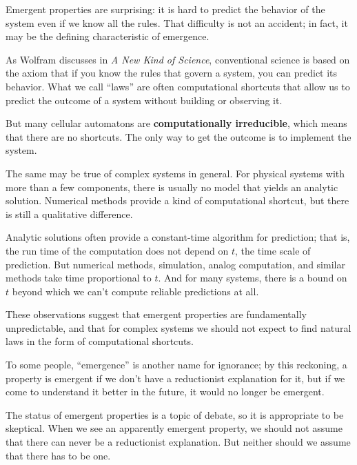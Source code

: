 \documentclass[12pt]{book}
\theoremstyle{exercise}
\begin{document}
Emergent properties are surprising: it is hard to predict the behavior
of the system even if we know all the rules.  That difficulty is not
an accident; in fact, it may be the defining characteristic of emergence.

As Wolfram discusses in {\em A New Kind of Science}, conventional science
is based on the axiom that if you know the rules that govern a system,
you can predict its behavior.  What we call ``laws'' are often
computational shortcuts that allow us to predict the outcome of a
system without building or observing it.


But many cellular automatons are {\bf computationally irreducible},
which means that there are no shortcuts.  The only way to get the
outcome is to implement the system.


The same may be true of complex systems in general.  For physical
systems with more than a few components, there is usually no model
that yields an analytic solution.  Numerical methods provide a kind of
computational shortcut, but there is still a qualitative difference.


Analytic solutions often provide a constant-time algorithm for
prediction; that is, the run time of the computation does not depend
on $t$, the time scale of prediction.  But numerical methods,
simulation, analog computation, and similar methods take time
proportional to $t$.  And for many systems, there is a bound on $t$
beyond which we can't compute reliable predictions at all.

These observations suggest that emergent properties are fundamentally
unpredictable, and that for complex systems we should not expect to
find natural laws in the form of computational shortcuts.

To some people, ``emergence'' is another name for ignorance; by this
reckoning, a property is emergent if we don't have a reductionist
explanation for it, but if we come to understand it better in the
future, it would no longer be emergent.

The status of emergent properties is a topic of debate, so it is
appropriate to be skeptical.  When we see an apparently emergent
property, we should not assume that there can never be a reductionist
explanation.  But neither should we assume that there has to be one.
\end{document}
